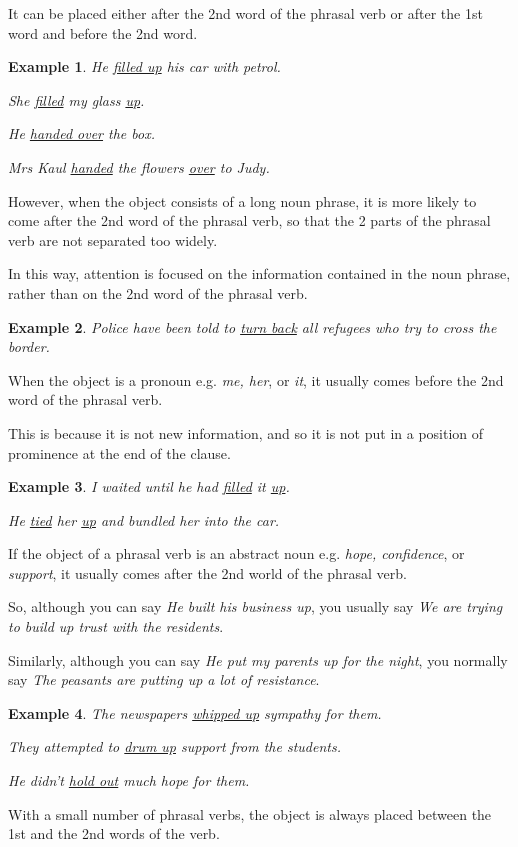 \documentclass[oneside]{book}
\numberwithin{equation}{section}
\newtheorem{example}{Example}[section]
\begin{document}
It can be placed either after the 2nd word of the phrasal verb or after the 1st word and before the 2nd word.
\begin{example}
    He \underline{filled up} his car with petrol.
    
    She \underline{filled} my glass \underline{up}.
    
    He \underline{handed over} the box.
    
    Mrs Kaul \underline{handed} the flowers \underline{over} to Judy.
\end{example}
%
\noindent{} However, when the object consists of a long noun phrase, it is more likely to come after the 2nd word of the phrasal verb, so that the 2 parts of the phrasal verb are not separated too widely.

In this way, attention is focused on the information contained in the noun phrase, rather than on the 2nd word of the phrasal verb.
\begin{example}
    Police have been told to \underline{turn back} all refugees who try to cross the border.
\end{example}
%
\noindent{} When the object is a pronoun e.g. \textit{me, her}, or \textit{it}, it usually comes before the 2nd word of the phrasal verb.

This is because it is not new information, and so it is not put in a position of prominence at the end of the clause.
\begin{example}
    I waited until he had \underline{filled} it \underline{up}.
    
    He \underline{tied} her \underline{up} and bundled her into the car.
\end{example}
%
\noindent{} If the object of a phrasal verb is an abstract noun e.g. \textit{hope, confidence}, or \textit{support}, it usually comes after the 2nd world of the phrasal verb.

So, although you can say \textit{He built his business up}, you usually say \textit{We are trying to build up trust with the residents}.

Similarly, although you can say \textit{He put my parents up for the night}, you normally say \textit{The peasants are putting up a lot of resistance}.
\begin{example}
    The newspapers \underline{whipped up} sympathy for them.
    
    They attempted to \underline{drum up} support from the students.
    
    He didn't \underline{hold out} much hope for them.
\end{example}
%
\noindent{} With a small number of phrasal verbs, the object is always placed between the 1st and the 2nd words of the verb.
\end{document}
